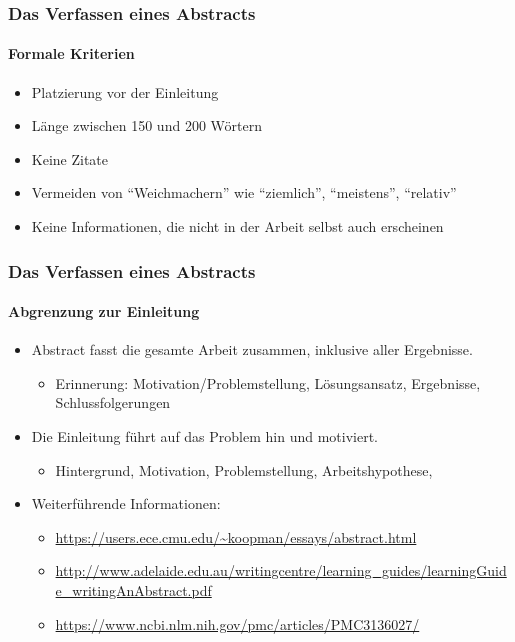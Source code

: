 \documentclass{i20lecture}
\begin{document}
\begin{frame}
  \frametitle{Das Verfassen eines Abstracts}
  \framesubtitle{Formale Kriterien}

  \begin{itemize}
    \item Platzierung vor der Einleitung
    \item Länge zwischen 150 und 200 Wörtern
    \item Keine Zitate
    \item Vermeiden von ``Weichmachern'' wie ``ziemlich'', ``meistens'',
    ``relativ''
    \item Keine Informationen, die nicht in der Arbeit selbst auch erscheinen
  \end{itemize}

\end{frame}

\begin{frame}
  \frametitle{Das Verfassen eines Abstracts}
  \framesubtitle{Abgrenzung zur Einleitung}
  
  \begin{itemize}
    \item Abstract fasst die gesamte Arbeit zusammen, inklusive aller
    Ergebnisse.
    \begin{itemize}
      \item Erinnerung: Motivation/Problemstellung, Lösungsansatz, Ergebnisse, Schlussfolgerungen
    \end{itemize}
    \item Die Einleitung führt auf das Problem hin und motiviert.
    \begin{itemize}
      \item Hintergrund, Motivation, Problemstellung, Arbeitshypothese, 
    \end{itemize}
    \bigskip
    \item Weiterführende Informationen:
    \begin{itemize}
      \item \url{https://users.ece.cmu.edu/~koopman/essays/abstract.html}
      \item \url{http://www.adelaide.edu.au/writingcentre/learning_guides/learningGuide_writingAnAbstract.pdf}
      \item \url{https://www.ncbi.nlm.nih.gov/pmc/articles/PMC3136027/}
      \end{itemize}
  \end{itemize}

\end{frame}
\end{document}
